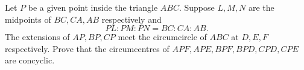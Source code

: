 Let $P$ be a given point inside the triangle $ABC$. Suppose $L,M,N$ are the midpoints of $BC, CA, AB$ respectively and \[PL: PM: PN= BC: CA: AB.\] The extensions of $AP, BP, CP$ meet the circumcircle of $ABC$ at $D,E,F$ respectively. Prove that the circumcentres of $APF, APE, BPF, BPD, CPD, CPE$ are concyclic.